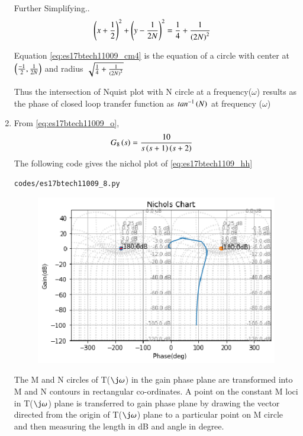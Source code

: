 \begin{enumerate}[label=\thesection.\arabic*.,ref=\thesection.\theenumi]
Further Simplifying..
\begin{align}
\brak{x+\frac{1}{2}}^{2}+\brak{y-\frac{1}{2N}}^{2} &= \frac{1}{4}+\frac{1}{\brak{2N}^{2}}
\label{eq:es17btech11009_cm4}
\end{align}

Equation \eqref{eq:es17btech11009_cm4} is the equation of a circle with center at $\left(\frac{-1}{2},\frac{1}{2N}\right)$ and radius $\sqrt{\frac{1}{4}+\frac{1}{\left(2N\right)^{2}}}$


Thus the intersection of Nquist plot with N circle at a frequency($\omega$) results as the phase of closed loop transfer function as $tan^{-1}\left(N\right)$ at frequency ($\omega$)
\\

\item
From \eqref{eq:es17btech11009_o},
\begin{align}
G_8\brak{s} &=\frac{10}{s\brak{s+1}\brak{s+2}}
\label{eq:es17btech1109_hh}
\end{align}
\solution 
The following code gives the nichol plot of \eqref{eq:es17btech1109_hh} 
\begin{lstlisting}
codes/es17btech11009_8.py
\end{lstlisting}

\begin{figure}[!h]
\includegraphics[width=\columnwidth]{./figs/es17btech11009_8.eps}
\caption{}
\label{fig:es17btech11009_8}
\end{figure}
The M and N circles of T($\j\omega$) in the gain phase plane are transformed into M and N contours in rectangular co-ordinates. A point on the constant M loci in T($\j\omega$) plane is transferred to gain phase plane by drawing the vector directed from the origin of T($\j\omega$) plane to a particular point on M circle and then measuring the length in dB and angle in degree.


\end{enumerate}
